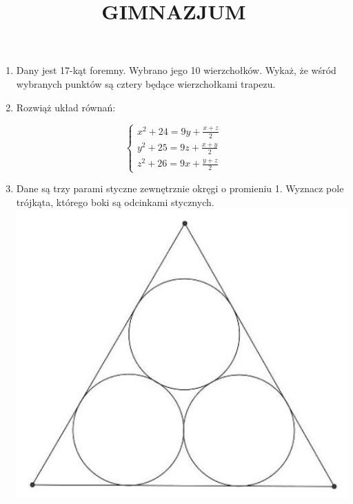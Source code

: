 \documentclass[10pt]{article}
\title{GIMNAZJUM }
\author{}
\date{}
\begin{document}
\maketitle
\begin{enumerate}
  \item Dany jest 17-kąt foremny. Wybrano jego 10 wierzchołków. Wykaż, że wśród wybranych punktów są cztery będące wierzchołkami trapezu.
  \item Rozwiąż układ równań:
\end{enumerate}

\[
\left\{\begin{array}{l}
x^{2}+24=9 y+\frac{x+z}{2} \\
y^{2}+25=9 z+\frac{x+y}{2} \\
z^{2}+26=9 x+\frac{y+z}{2}
\end{array}\right.
\]

\begin{enumerate}
  \setcounter{enumi}{2}
  \item Dane są trzy parami styczne zewnętrznie okręgi o promieniu 1. Wyznacz pole trójkąta, którego boki są odcinkami stycznych.\\
\includegraphics[max width=\textwidth, center]{2024_11_21_e501b0bc4e839ef815dfg-1}
\end{enumerate}
\end{document}

